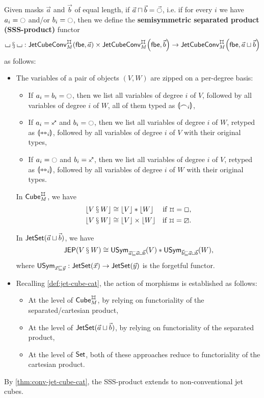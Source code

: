 \documentclass[a4paper]{memoir}
\begin{document}
\begin{definition} \label{def:sssprod}
	Given masks $\vec a$ and $\vec b$ of equal length, if $\vec a \sqcap \vec b = \vec \npolar$, i.e. if for every $i$ we have $a_i = \npolar$ and/or $b_i = \npolar$, then we define the \textbf{semisymmetric separated product (SSS-product)} functor
	\[
		\loch \sss \loch : \convjetcubetri \mycubex M {\vec a} \times \convjetcubetri \mycubex M {\vec b} \to \convjetcubetri \mycubex M {\vec a \sqcup \vec b}
	\]
	as follows:
	\begin{itemize}
		\item %
		The variables of a pair of objects $(V, W)$ are zipped on a per-degree basis:
		\begin{itemize}
			\item If $a_i = b_i = \npolar$, then we list all variables of degree $i$ of $V$, followed by all variables of degree $i$ of $W$, all of them typed as ${\llparenthesis \frown_i \rrparenthesis}$,
			\item If $a_i = \ypolar$ and $b_i = \npolar$, then we list all variables of degree $i$ of $W$, retyped as ${\llparenthesis \leftrightarrowtriangle_i \rrparenthesis}$, followed by all variables of degree $i$ of $V$ with their original types,
			\item If $a_i = \npolar$ and $b_i = \ypolar$, then we list all variables of degree $i$ of $V$, retyped as ${\llparenthesis \leftrightarrowtriangle_i \rrparenthesis}$, followed by all variables of degree $i$ of $W$ with their original types.
		\end{itemize}
		\begin{corollary} \label{thm:erase-sssprod}
			In $\cubecat_M^\mycubex$, we have
			\begin{align*}
				\erasejc{V \sss W} &\cong \erasejc V * \erasejc W &\text{if $\mycubex = \affine$,} \\
				\erasejc{V \sss W} &\cong \erasejc V \times \erasejc W &\text{if $\mycubex = \cartes$.}
			\end{align*}
		\end{corollary}
		\begin{corollary}
			In $\mathsf{JetSet}(\vec a \sqcup \vec b)$, we have
			\[
				\mathsf{JEP}(V \mathbin{\mathsection} W) \cong \mathsf{USym}_{\vec a \sqsubseteq \vec a \sqcup \vec b}(V) * \mathsf{USym}_{\vec b \sqsubseteq \vec a \sqcup \vec b}(W),
			\]
			where $\mathsf{USym}_{\vec x \sqsubseteq \vec y} : \mathsf{JetSet}(\vec x) \to \mathsf{JetSet}(\vec y)$ is the forgetful functor.
		\end{corollary}
		\item Recalling \cref{def:jet-cube-cat}, the action of morphisms is established as follows:
		\begin{itemize}
			\item At the level of $\cubecat_M^\mycubex$, by relying on functoriality of the separated/cartesian product,
			\item At the level of $\mathsf{JetSet}(\vec a \sqcup \vec b)$, by relying on functoriality of the separated product,
			\item At the level of ${\mathsf{Set}}$, both of these approaches reduce to functoriality of the cartesian product.
		\end{itemize}
	\end{itemize}
	By \cref{thm:conv-jet-cube-cat}, the SSS-product extends to non-conventional jet cubes.
\end{definition}
\end{document}
